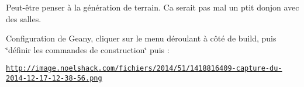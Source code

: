 Peut-\/être penser à la génération de terrain. Ca serait pas mal un ptit donjon avec des salles.

Configuration de Geany, cliquer sur le menu déroulant à côté de build, puis \char`\"{}définir les commandes de construction\char`\"{} puis \+:

\href{http://image.noelshack.com/fichiers/2014/51/1418816409-capture-du-2014-12-17-12-38-56.png}{\tt http\+://image.\+noelshack.\+com/fichiers/2014/51/1418816409-\/capture-\/du-\/2014-\/12-\/17-\/12-\/38-\/56.\+png} 